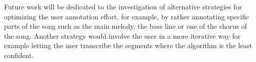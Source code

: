 \documentclass{article}
\begin{document}
Future work will be dedicated to the investigation of alternative strategies for optimizing the user annotation effort, for example, by rather annotating specific parts of the song such as the main melody, the bass line or one of the chorus of the song. Another strategy would involve the user in a more iterative way for example letting the user transcribe the segments where the algorithm is the least confident.





\end{document}
